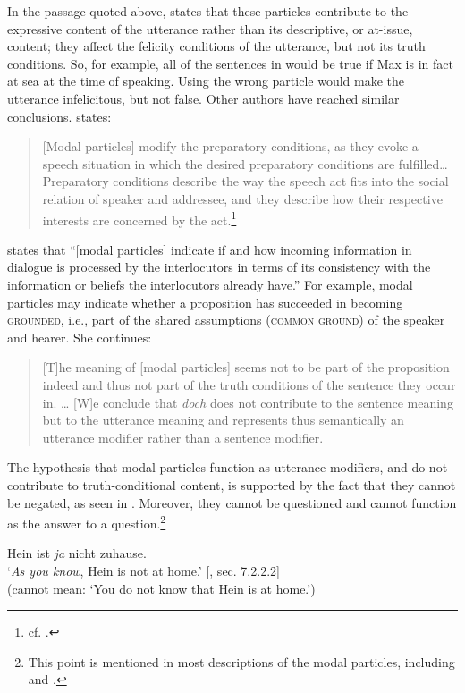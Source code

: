 In the passage quoted above, \citet{Zimmermann2011} states that these particles contribute to the expressive content of the utterance rather than its descriptive, or at-issue, content; they affect the felicity conditions of the utterance, but not its truth conditions. So, for example, all of the sentences in  would be true if Max is in fact at sea at the time of speaking. Using the wrong particle would make the utterance infelicitous, but not false. Other authors have reached similar conclusions. \citet{Waltereit2001} states:


\begin{quote}
{}[Modal particles] modify the preparatory conditions, as they evoke a speech situation in which the desired preparatory conditions are fulfilled… Preparatory conditions describe the way the speech act fits into the social relation of speaker and addressee, and they describe how their respective interests are concerned by the act.\footnote{cf. \citet{Searle1969}.}
\end{quote}


\citet{Karagjosova2000} states that “[modal particles] indicate if and how incoming information in dialogue is processed by the interlocutors in terms of its consistency with the information or beliefs the interlocutors already have.” For example, modal particles may indicate whether a proposition has succeeded in becoming \textsc{grounded}, i.e., part of the shared assumptions (\textsc{common ground}) of the speaker and hearer. She continues:


\begin{quote}
{}[T]he meaning of [modal particles] seems not to be part of the proposition indeed and thus not part of the truth conditions of the sentence they occur in. …  [W]e conclude that \textit{doch} does not contribute to the sentence meaning but to the utterance meaning and represents thus semantically an utterance modifier rather than a sentence modifier.
\end{quote}


The hypothesis that  modal particles function as utterance modifiers, and do not contribute to truth-conditional content, is supported by the fact that they cannot be negated, as seen in . Moreover, they cannot be questioned and cannot function as the answer to a question.\footnote{This point is mentioned in most descriptions of the  modal particles, including \citet{Bross2012} and \citet{Gutzmann2015}.}


\ea \label{ex:11.28}
Hein ist \textit{ja} nicht zuhause.\\
\glt ‘\textit{As you know}, Hein is not at home.’  [\citealt{Gutzmann2015}, sec. 7.2.2.2]\\
(cannot mean: ‘You do not know that Hein is at home.’)
\z

